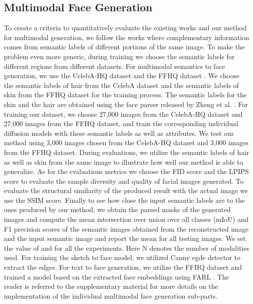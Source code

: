 \documentclass[10pt,twocolumn,letterpaper]{article}
\begin{document}
 \subsection{Multimodal Face Generation} To create a criteria to quantitatively evaluate the existing works and our method for multimodal generation, we follow the works \cite{wu2018multimodal} where complementary information comes from semantic labels of different portions of the same image. To make the problem even more generic, during training we choose the  semantic labels for different regions from different datasets. For multimodal semantics to face generation, we use the CelebA-HQ dataset \cite{karras2017progressive} and the FFHQ dataset \cite{karras2019style}. We choose the semantic labels of hair from the CelebA dataset and the semantic labels of skin from the FFHQ dataset for the training process. The semantic labels for the skin and the hair are obtained using the face parser released by Zheng et al. \cite{zheng2021farl}. For training our dataset, we choose 27,000 images from the CelebA-HQ dataset and 27,000 images from the FFHQ dataset, and train the corresponding individual diffusion models with these semantic labels as well as attributes. We test our method using 3,000 images chosen from the CelebA-HQ dataset and 3,000  images from the FFHQ dataset. During evaluations, we utilize the semantic labels of hair as well as skin from the same image to illustrate how well our method is able to generalize. As for the evaluations metrics we choose the FID score \cite{heusel2017gans} and the LPIPS score \cite{zhang2018perceptual}  to evaluate the sample diversity and quality of facial images generated. To evaluate the structural similarity of the produced result with the actual image we use the SSIM score. Finally to see how close the input semantic labels are to the ones produced by our method, we obtain the parsed masks of the generated images and compute the  mean intersection over union over all classes (mIoU) and F1 precision scores of the semantic images obtained from the reconstructed image and the input semantic image and report the mean for all testing images. We set the value of  and  for all the experiments. Here N denotes the number of modalities used. For training the sketch to face model, we utilized Canny egde detector\cite{ding2001canny} to extract the edges. For text to face generation, we utilize the FFHQ dataset and trained a model based on the extracted face embeddings using FARL \cite{zheng2021farl}. The reader is referred to the supplementary material for more details on the implementation of the individual multimodal face generation sub-parts.
\end{document}

